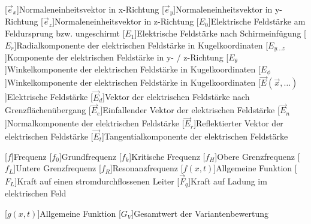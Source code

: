 \begin{acronym}[Platzhalterwort]
[$\vec e_x$]{Normaleneinheitsvektor in x-Richtung}
[$\vec e_y$]{Normaleneinheitsvektor in y-Richtung}
[$\vec e_z$]{Normaleneinheitsvektor in z-Richtung}
[$E_0$]{\acrounit{\volt\per\meter}Elektrische Feldstärke am Feldursprung bzw. ungeschirmt}
[$E_1$]{\acrounit{\volt\per\meter}Elektrische Feldstärke nach Schirmeinfügung}
[$E_r$]{\acrounit{\volt\per\meter}Radialkomponente der elektrischen Feldstärke in Kugelkoordinaten}
[$E_{y\ldots z}$]{\acrounit{\volt\per\meter}Komponente der elektrischen Feldstärke in y- / z-Richtung}
[$E_{\theta}$]{\acrounit{\volt\per\meter}Winkelkomponente der elektrischen Feldstärke in Kugelkoordinaten}
[$E_{\phi}$]{\acrounit{\volt\per\meter}Winkelkomponente der elektrischen Feldstärke in Kugelkoordinaten}
[$\vec E(\vec x, \ldots)$]{\acrounit{\volt\per\meter}Elektrische Feldstärke}
[$\vec E_d$]{\acrounit{\volt\per\meter}Vektor der elektrischen Feldstärke nach Grenzflächenübergang}
[$\vec E_e$]{\acrounit{\volt\per\meter}Einfallender Vektor der elektrischen Feldstärke}
[$\vec E_n$]{\acrounit{\volt\per\meter}Normalkomponente der elektrischen Feldstärke}
[$\vec E_r$]{\acrounit{\volt\per\meter}Reflektierter Vektor der elektrischen Feldstärke}
[$\vec E_t$]{\acrounit{\volt\per\meter}Tangentialkomponente der elektrischen Feldstärke}


[$f$]{\acrounit{\hertz}Frequenz}
[$f_0$]{\acrounit{\hertz}Grundfrequenz}
[$f_k$]{\acrounit{\hertz}Kritische Frequenz}
[$f_H$]{\acrounit{\hertz}Obere Grenzfrequenz}
[$f_L$]{\acrounit{\hertz}Untere Grenzfrequenz}
[$f_R$]{\acrounit{\hertz}Resonanzfrequenz}
[$f(x,t)$]{\acrounit{-}Allgemeine Funktion}
[$F_L$]{\acrounit{\newton}Kraft auf einen stromdurchflossenen Leiter}
[$\vec F_q$]{\acrounit{\newton}Kraft auf Ladung im elektrischen Feld}

[$g(x,t)$]{\acrounit{-}Allgemeine Funktion}
[$G_V$]{\acrounit{-}Gesamtwert der Variantenbewertung}


\end{acronym}
